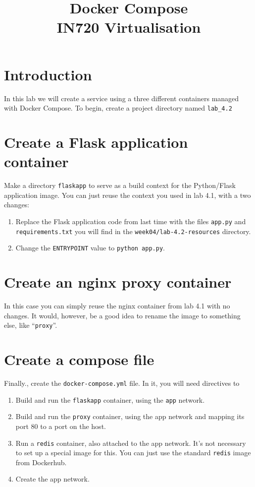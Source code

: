 \documentclass{article}
\begin{document}
\title{Docker Compose\\IN720 Virtualisation}
\date{}
\maketitle

\section*{Introduction}
In this lab we will create a service using a three different containers managed with Docker Compose. To begin, create a project directory named \texttt{lab\_4.2}

\section{Create a Flask application container}
Make a directory \texttt{flaskapp} to serve as a build context for the Python/Flask application image. You can just reuse the context you used in lab 4.1, with a two changes:

  \begin{enumerate}
    \item Replace the Flask application code from last time with the files \texttt{app.py} and \texttt{requirements.txt} you will find in the \texttt{week04/lab-4.2-resources} directory.
    \item Change the \texttt{ENTRYPOINT} value to \texttt{python app.py}.
    \end{enumerate}

\section{Create an nginx proxy container}
In this case you can simply reuse the nginx container from lab 4.1 with no changes. It would, however, be a good idea to rename the image to something else, like ``\texttt{proxy}''.

\section{Create a compose file}
Finally., create the \texttt{docker-compose.yml} file. In it, you will need directives to

\begin{enumerate}
  \item Build and run the \texttt{flaskapp} container, using the \texttt{app} network.
  \item Build and run the \texttt{proxy} container, using the app network and mapping its port 80 to a port on the host.
  \item Run a \texttt{redis} container, also attached to the app network. It's not necessary to set up a special image for this. You can just use the standard \texttt{redis} image from Dockerhub.
  \item Create the app network.
  \end{enumerate}
\end{document}
